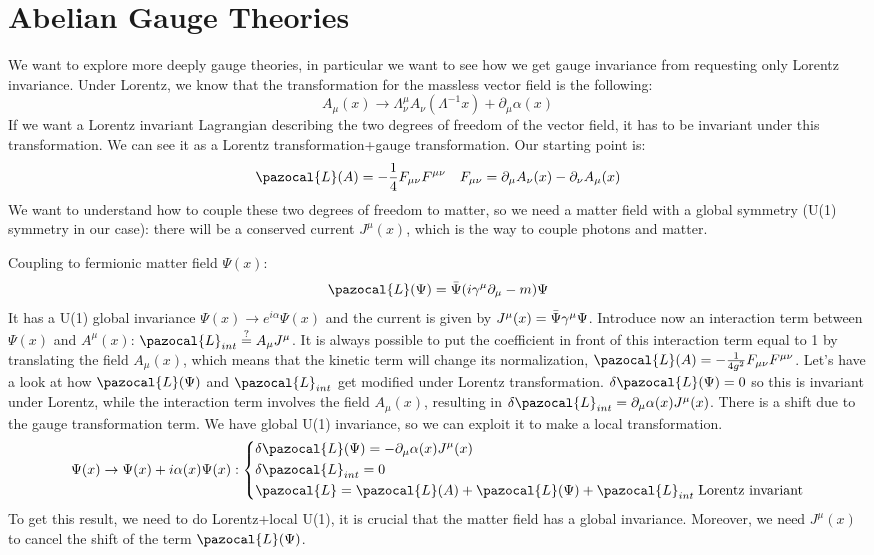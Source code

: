\documentclass[../main.tex]{subfiles}
\begin{document}
\section{Abelian Gauge Theories}
We want to explore more deeply gauge theories, in particular we want to see how we get gauge invariance from requesting only Lorentz invariance. Under Lorentz, we know that the transformation for the massless vector field is the following:
\[
A_\mu(x)\to\Lambda^\mu_\nu A_\nu(\Lambda^{-1}x)+\partial_\mu\alpha(x)
\]
If we want a Lorentz invariant Lagrangian describing the two degrees of freedom of the vector field, it has to be invariant under this transformation. We can see it as a Lorentz transformation+gauge transformation. Our starting point is:
\[
\pazocal{L}(A)=-\frac{1}{4}F_{\mu\nu}F^{\mu\nu} \quad F_{\mu\nu}=\partial_\mu A_\nu(x)-\partial_\nu A_\mu(x)
\]
We want to understand how to couple these two degrees of freedom to matter, so we need a matter field with a global symmetry (U(1) symmetry in our case): there will be a conserved current $J^\mu(x)$, which is the way to couple photons and matter.\\
\begin{example}
Coupling to fermionic matter field $\Psi(x)$:
\[
\pazocal{L}(\Psi)=\Bar{\Psi}(i\gamma^\mu\partial_\mu-m)\Psi
\]
It has a U(1) global invariance $\Psi(x)\to e^{i\alpha}\Psi(x)$ and the current is given by $J^\mu(x)=\Bar{\Psi}\gamma^\mu\Psi$. Introduce now an interaction term between $\Psi(x)$ and $A^\mu(x)$: $\pazocal{L}_{int}\stackrel{?}{=}A_\mu J^\mu$. It is always possible to put the coefficient in front of this interaction term equal to 1 by translating the field $A_\mu(x)$, which means that the kinetic term will change its normalization, $\pazocal{L}(A)=-\frac{1}{4g^2}F_{\mu\nu}F^{\mu\nu}$. Let's have a look at how $\pazocal{L}(\Psi)$ and $\pazocal{L}_{int}$ get modified under Lorentz transformation. $\delta\pazocal{L}(\Psi)=0$ so this is invariant under Lorentz, while the interaction term involves the field $A_\mu(x)$, resulting in $\delta\pazocal{L}_{int}=\partial_\mu\alpha(x)J^\mu(x)$. There is a shift due to the gauge transformation term. We have global U(1) invariance, so we can exploit it to make a local transformation.
\[
\Psi(x)\to\Psi(x)+i\alpha(x)\Psi(x):\left\{
\begin{aligned}
&\delta\pazocal{L}(\Psi)=-\partial_\mu\alpha(x)J^\mu(x)\\
&\delta\pazocal{L}_{int}=0\\
&\pazocal{L}=\pazocal{L}(A)+\pazocal{L}(\Psi)+\pazocal{L}_{int} \;\text{Lorentz invariant}
\end{aligned}
\right.
\]
To get this result, we need to do Lorentz+local U(1), it is crucial that the matter field has a global invariance. Moreover, we need $J^\mu(x)$ to cancel the shift of the term $\pazocal{L}(\Psi)$.
\end{example}
\end{document}
